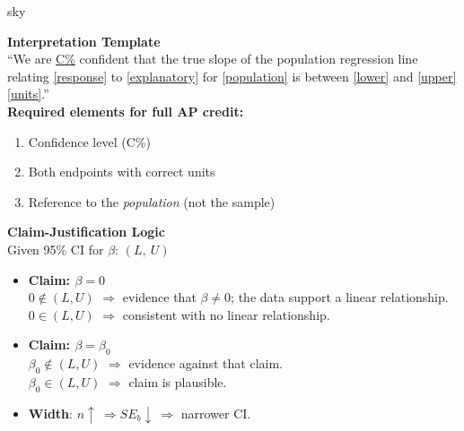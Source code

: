 \documentclass[10pt]{article}
\begin{document}
\begin{skillbox}{sky}
\begin{minipage}[t]{0.48\linewidth}
    \textbf{Interpretation Template}\\[4pt]
    ``We are \underline{C\%} confident that the true slope of the population regression line
    relating \underline{[response]} to \underline{[explanatory]} for \underline{[population]}
    is between \underline{[lower]} and \underline{[upper]} \underline{[units]}.''\\[6pt]
    \textbf{Required elements for full AP credit:}
    \begin{enumerate}
        \item Confidence level (C\%)
        \item Both endpoints with correct units
        \item Reference to the \emph{population} (not the sample)
    \end{enumerate}
\end{minipage}
\hfill
\begin{minipage}[t]{0.48\linewidth}
    \textbf{Claim-Justification Logic}\\[4pt]
    Given 95\% CI for $\beta$: $(L,\ U)$
    \begin{itemize}
        \item \textbf{Claim: $\beta = 0$}\\
              $0 \notin (L,U)$ $\Rightarrow$ evidence that $\beta \ne 0$;
              the data support a linear relationship.\\
              $0 \in (L,U)$ $\Rightarrow$ consistent with no linear relationship.
        \item \textbf{Claim: $\beta = \beta_0$}\\
              $\beta_0 \notin (L,U)$ $\Rightarrow$ evidence against that claim.\\
              $\beta_0 \in (L,U)$ $\Rightarrow$ claim is plausible.
        \item \textbf{Width}: $n \uparrow\ \Rightarrow SE_b \downarrow\ \Rightarrow$
              narrower CI.
    \end{itemize}
\end{minipage}
\end{skillbox}
\end{document}
